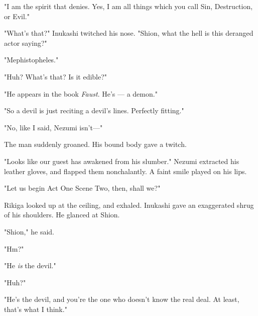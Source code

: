 "I am the spirit that denies. Yes, I am all things which you call Sin,
Destruction, or Evil."

"What's that?" Inukashi twitched his nose. "Shion, what the hell is this
deranged actor saying?"

"Mephistopheles."

"Huh? What's that? Is it edible?"

"He appears in the book \emph{Faust}. He's --- a demon."

"So a devil is just reciting a devil's lines. Perfectly fitting."

"No, like I said, Nezumi isn't---"

The man suddenly groaned. His bound body gave a twitch.

"Looks like our guest has awakened from his slumber." Nezumi extracted
his leather gloves, and flapped them nonchalantly. A faint smile played
on his lips.

"Let us begin Act One Scene Two, then, shall we?"

Rikiga looked up at the ceiling, and exhaled. Inukashi gave an
exaggerated shrug of his shoulders. He glanced at Shion.

"Shion," he said.

"Hm?"

"He \emph{is} the devil."

"Huh?"

"He's the devil, and you're the one who doesn't know the real deal. At
least, that's what I think."